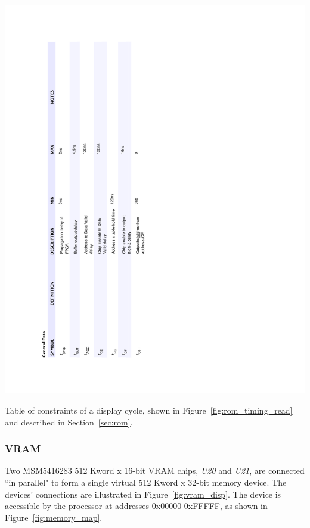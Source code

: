 \documentclass[titlepage]{scrartcl}
\begin{document}
	\begin{table}[h!]
	\vspace{-2cm}
	\centerline{\includegraphics[width=20cm]{img/rom_read_table.pdf}}
		\vspace{0cm}
                	\caption{Table of constraints of a display cycle, shown in Figure~\ref{fig:rom_timing_read} and described in Section~\ref{sec:rom}.}
               	\label{tab:rom_timing_read}
	\end{table}

	\clearpage
	
	\subsubsection{VRAM \label{sec:vram}}
	Two MSM5416283 512 Kword x 16-bit VRAM chips, \textit{U20} and \textit{U21}, are connected ``in parallel" to form a single virtual 512 Kword x 32-bit memory device. The devices' connections are illustrated in Figure~\ref{fig:vram_disp}. The device is accessible by the processor at addresses 0x00000-0xFFFFF, as shown in Figure~\ref{fig:memory_map}.\\
\end{document}
